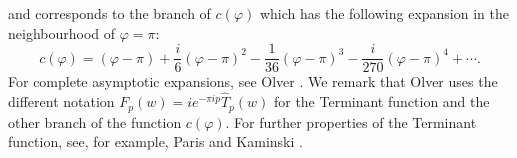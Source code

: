 \documentclass[a4paper,twoside,10pt]{amsart}
\numberwithin{equation}{section}
\begin{document}
and corresponds to the branch of $c\left( \varphi  \right)$ which has the following expansion in the neighbourhood of $\varphi = \pi$:
\begin{equation}\label{eq14}
c\left( \varphi  \right) = \left( {\varphi  - \pi } \right) + \frac{i}{6}\left( {\varphi  - \pi } \right)^2  - \frac{1}{{36}}\left( {\varphi  - \pi } \right)^3  - \frac{i}{{270}}\left( {\varphi  - \pi } \right)^4  +  \cdots .
\end{equation}
For complete asymptotic expansions, see Olver \cite{Olver5}. We remark that Olver uses the different notation $F_p \left( w \right) = ie^{ - \pi ip} \widehat T_p \left( w \right)$ for the Terminant function and the other branch of the function $c\left( \varphi  \right)$. For further properties of the Terminant function, see, for example, Paris and Kaminski \cite[Chapter 6]{Paris3}.
\end{document}
